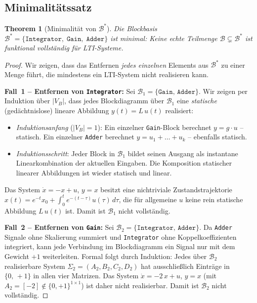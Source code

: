 ﻿\documentclass[12pt,a4paper]{article}
\newtheorem{theorem}{Theorem}[section]
\theoremstyle{definition}
\begin{document}
\subsection{Minimalitätssatz}

\begin{theorem}[Minimalität von $\mathcal{B}^*$]
\label{thm:minimal}
Die Blockbasis $\mathcal{B}^* = \{\texttt{Integrator},\;\texttt{Gain},\;\texttt{Adder}\}$
ist minimal: Keine echte Teilmenge $\mathcal{B} \subsetneq \mathcal{B}^*$
ist funktional vollständig für LTI-Systeme.
\end{theorem}

\begin{proof}
Wir zeigen, dass das Entfernen \emph{jedes einzelnen} Elements aus
$\mathcal{B}^*$ zu einer Menge führt, die mindestens ein LTI-System
nicht realisieren kann.

\medskip
\textbf{Fall~1 -- Entfernen von \texttt{Integrator}:}
Sei $\mathcal{B}_1 = \{\texttt{Gain},\,\texttt{Adder}\}$. Wir zeigen
per Induktion über $|V_B|$, dass jedes Blockdiagramm über $\mathcal{B}_1$
eine \emph{statische} (gedächtnislose) lineare Abbildung
$y(t) = L\,u(t)$ realisiert:
\begin{itemize}[nosep]
  \item \emph{Induktionsanfang} ($|V_B|=1$): Ein einzelner \texttt{Gain}-Block
        berechnet $y = g\cdot u$ -- statisch. Ein einzelner \texttt{Adder}
        berechnet $y = u_1 + \ldots + u_k$ -- ebenfalls statisch.
  \item \emph{Induktionsschritt}: Jeder Block in $\mathcal{B}_1$ bildet
        seinen Ausgang als instantane Linearkombination der aktuellen
        Eingaben. Die Komposition statischer linearer Abbildungen ist wieder
        statisch und linear.
\end{itemize}
Das System $\dot{x} = -x + u$,\; $y = x$ besitzt eine nichtriviale
Zustandstrajektorie
$x(t) = e^{-t}x_0 + \int_0^t e^{-(t-\tau)}u(\tau)\,d\tau$,
die für allgemeine $u$ keine rein statische Abbildung $L\,u(t)$ ist.
Damit ist $\mathcal{B}_1$ nicht vollständig.

\medskip
\textbf{Fall~2 -- Entfernen von \texttt{Gain}:}
Sei $\mathcal{B}_2 = \{\texttt{Integrator},\,\texttt{Adder}\}$. Da
\texttt{Adder} Signale ohne Skalierung summiert und \texttt{Integrator}
ohne Koppelkoeffizienten integriert, kann jede Verbindung im Blockdiagramm
ein Signal nur mit dem Gewicht $+1$ weiterleiten. Formal folgt durch
Induktion: Jedes über $\mathcal{B}_2$ realisierbare System
$\Sigma_2 = (A_2, B_2, C_2, D_2)$ hat ausschließlich Einträge in
$\{0,\,+1\}$ in allen vier Matrizen. Das System
$\dot{x} = -2\,x + u$,\; $y = x$ (mit $A_2 = [-2] \notin \{0,+1\}^{1\times
1}$) ist daher nicht realisierbar. Damit ist $\mathcal{B}_2$ nicht vollständig.


\end{proof}
\end{document}
